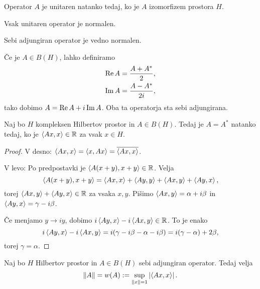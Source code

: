 \begin{opomba}
  Operator $A$ je unitaren natanko tedaj, ko je $A$ izomorfizem prostora $H$.
\end{opomba}

\begin{opomba}
  Vsak unitaren operator je normalen.
\end{opomba}

\begin{opomba}
  Sebi adjungiran operator je vedno normalen.
\end{opomba}

Če je $A \in B(H)$, lahko definiramo
\begin{gather*}
  \operatorname{Re} A = \frac{A+A^*}{2}, \\
  \operatorname{Im} A = \frac{A - A^*}{2i},
\end{gather*}
tako dobimo $A = \operatorname{Re} A + i \operatorname{Im} A$.
Oba ta operatorja sta sebi adjungirana.

\begin{trditev}
  Naj bo $H$ kompleksen Hilbertov prostor in $A \in B(H)$.
  Tedaj je $A = A^*$ natanko tedaj, ko je $\left< Ax,x \right> \in \mathbb{R}$ za vsak $x \in H$.
\end{trditev}

\begin{proof}
  V desno: $\left< Ax,x \right> = \left< x,Ax \right>= \overline{\left< Ax, x \right>}$.

  V levo:
  Po predpostavki je $\left< A(x+y), x+y \right> \in \mathbb{R}$.
  Velja
  \[
	\left< A(x+y), x+y \right> = \left< Ax, x \right> + \left< Ay,y \right> + \left< Ax,y \right> + \left< Ay,x \right>,
  \]
  torej $\left< Ax,y \right> + \left< Ay,x \right> \in \mathbb{R}$ za vsaka $x,y$.
  Pišimo $\left< Ax,y \right> = \alpha + i \beta$ in $\left< Ay,x \right> = \gamma - i \beta$.

  Če menjamo $y \to i y$, dobimo $i \left< Ay, x \right> - i \left< Ax,y \right> \in \mathbb{R}$.
  To je enako
  \[
	i \left< Ay, x \right> - i \left< Ax,y \right>
	= i(\gamma - i \beta - \alpha - i \beta)
	= i(\gamma - \alpha) + 2 \beta,
  \]
  torej $\gamma = \alpha$.
\end{proof}


\begin{izrek}
  Naj bo $H$ Hilbertov prostor in $A \in B(H)$ sebi adjungiran operator.
  Tedaj velja
  \[
	\left\lVert A\right\rVert = w(A) := \sup_{\left\lVert x\right\rVert = 1} \left| \left< Ax,x \right> \right|.
  \]
\end{izrek}

